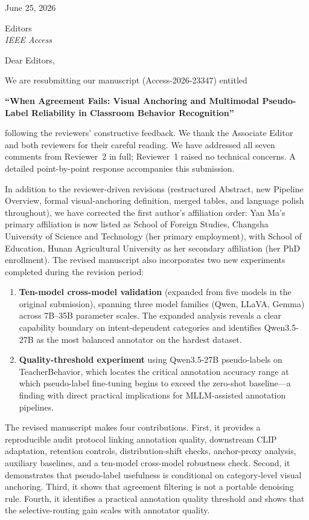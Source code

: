 \documentclass[11pt]{article}
\begin{document}
\begin{flushright}
June 25, 2026
\end{flushright}

Editors \\
\textit{IEEE Access}

Dear Editors,

We are resubmitting our manuscript (Access-2026-23347) entitled

\textbf{``When Agreement Fails: Visual Anchoring and Multimodal Pseudo-Label
Reliability in Classroom Behavior Recognition''}

following the reviewers' constructive feedback. We thank the Associate Editor
and both reviewers for their careful reading. We have addressed all seven
comments from Reviewer~2 in full; Reviewer~1 raised no technical concerns.
A detailed point-by-point response accompanies this submission.

In addition to the reviewer-driven revisions (restructured Abstract, new
Pipeline Overview, formal visual-anchoring definition, merged tables, and
language polish throughout), we have corrected the first author's affiliation
order: Yan Ma's primary affiliation is now listed as School of Foreign Studies,
Changsha University of Science and Technology (her primary employment), with
School of Education, Hunan Agricultural University as her secondary affiliation
(her PhD enrollment). The revised manuscript also incorporates two new
experiments completed during the revision period:

\begin{enumerate}
  \item \textbf{Ten-model cross-model validation} (expanded from five models
  in the original submission), spanning three model families (Qwen, LLaVA,
  Gemma) across 7B--35B parameter scales. The expanded analysis reveals a
  clear capability boundary on intent-dependent categories and identifies
  Qwen3.5-27B as the most balanced annotator on the hardest dataset.
  \item \textbf{Quality-threshold experiment} using Qwen3.5-27B pseudo-labels
  on TeacherBehavior, which locates the critical annotation accuracy range
  at which pseudo-label fine-tuning begins to exceed the zero-shot baseline---a
  finding with direct practical implications for MLLM-assisted annotation
  pipelines.
\end{enumerate}

The revised manuscript makes four contributions. First, it provides a
reproducible audit protocol linking annotation quality, downstream CLIP
adaptation, retention controls, distribution-shift checks, anchor-proxy
analysis, auxiliary baselines, and a ten-model cross-model robustness check.
Second, it demonstrates that pseudo-label usefulness is conditional on
category-level visual anchoring. Third, it shows that agreement filtering is
not a portable denoising rule. Fourth, it identifies a practical annotation
quality threshold and shows that the selective-routing gain scales with
annotator quality.
\end{document}
